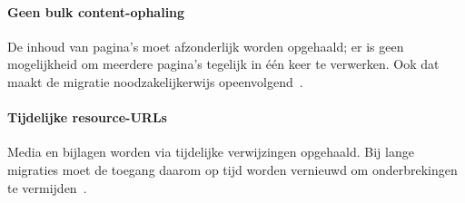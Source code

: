 \paragraph{Geen bulk content-ophaling}
De inhoud van pagina's moet afzonderlijk worden opgehaald; er is geen mogelijkheid om meerdere pagina's tegelijk in één keer te verwerken. Ook dat maakt de migratie noodzakelijkerwijs opeenvolgend~\autocite{msgraph2025notes}.

\paragraph{Tijdelijke resource-URLs}
Media en bijlagen worden via tijdelijke verwijzingen opgehaald. Bij lange migraties moet de toegang daarom op tijd worden vernieuwd om onderbrekingen te vermijden~\autocite{msgraph2025notes}.


